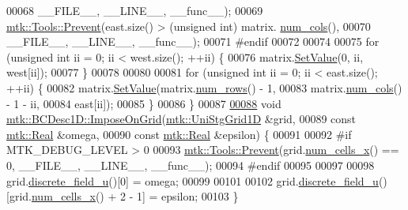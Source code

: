 \begin{DoxyCode}
00068                       \_\_FILE\_\_, \_\_LINE\_\_, \_\_func\_\_);
00069   \hyperlink{classmtk_1_1Tools_afe5bb096309258e2e72503fd7b41c7e0}{mtk::Tools::Prevent}(east.size() > (\textcolor{keywordtype}{unsigned} int) matrix.
      \hyperlink{classmtk_1_1DenseMatrix_af6f78373aaf2136f0c78974d7c8de0a8}{num\_cols}(),
00070                       \_\_FILE\_\_, \_\_LINE\_\_, \_\_func\_\_);
00071 \textcolor{preprocessor}{  #endif}
00072 
00074 
00075   \textcolor{keywordflow}{for} (\textcolor{keywordtype}{unsigned} \textcolor{keywordtype}{int} ii = 0; ii < west.size(); ++ii) \{
00076     matrix.\hyperlink{classmtk_1_1DenseMatrix_ae0f873a6d3a734da467cafb817da64ae}{SetValue}(0, ii, west[ii]);
00077   \}
00078 
00080 
00081   \textcolor{keywordflow}{for} (\textcolor{keywordtype}{unsigned} \textcolor{keywordtype}{int} ii = 0; ii < east.size(); ++ii) \{
00082     matrix.\hyperlink{classmtk_1_1DenseMatrix_ae0f873a6d3a734da467cafb817da64ae}{SetValue}(matrix.\hyperlink{classmtk_1_1DenseMatrix_a17d8d3b9cc0926044b6972dd190a5c21}{num\_rows}() - 1,
00083                     matrix.\hyperlink{classmtk_1_1DenseMatrix_af6f78373aaf2136f0c78974d7c8de0a8}{num\_cols}() - 1 - ii,
00084                     east[ii]);
00085   \}
00086 \}
00087 
\hypertarget{mtk__bc__desc__1d_8cc_source_l00088}{}\hyperlink{classmtk_1_1BCDesc1D_a79a659c6a6333af8e51c463cf1ecb0b7}{00088} \textcolor{keywordtype}{void} \hyperlink{classmtk_1_1BCDesc1D_a79a659c6a6333af8e51c463cf1ecb0b7}{mtk::BCDesc1D::ImposeOnGrid}(\hyperlink{classmtk_1_1UniStgGrid1D}{mtk::UniStgGrid1D} &grid,
00089                                  \textcolor{keyword}{const} \hyperlink{group__c01-roots_gac080bbbf5cbb5502c9f00405f894857d}{mtk::Real} &omega,
00090                                  \textcolor{keyword}{const} \hyperlink{group__c01-roots_gac080bbbf5cbb5502c9f00405f894857d}{mtk::Real} &epsilon) \{
00091 
00092 \textcolor{preprocessor}{  #if MTK\_DEBUG\_LEVEL > 0}
00093   \hyperlink{classmtk_1_1Tools_afe5bb096309258e2e72503fd7b41c7e0}{mtk::Tools::Prevent}(grid.\hyperlink{classmtk_1_1UniStgGrid1D_af1b3729d8afa07be5b2775ed68015b80}{num\_cells\_x}() == 0, \_\_FILE\_\_, \_\_LINE\_\_, \_\_func\_\_);
00094 \textcolor{preprocessor}{  #endif}
00095 
00097 
00098   grid.\hyperlink{classmtk_1_1UniStgGrid1D_acf28d702f6e702599986afcb253bbfc1}{discrete\_field\_u}()[0] = omega;
00099 
00101 
00102   grid.\hyperlink{classmtk_1_1UniStgGrid1D_acf28d702f6e702599986afcb253bbfc1}{discrete\_field\_u}()[grid.\hyperlink{classmtk_1_1UniStgGrid1D_af1b3729d8afa07be5b2775ed68015b80}{num\_cells\_x}() + 2 - 1] = epsilon;
00103 \}
\end{DoxyCode}
